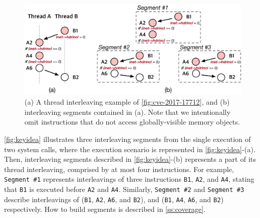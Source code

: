 %
\begin{figure}[t]
  \centering
  \includegraphics[width=0.99\linewidth]{fig/intuition.pdf}
  \caption{(a) A thread interleaving example of
    \autoref{fig:cve-2017-17712}, and (b) interleaving segments
    contained in (a).  Note that we intentionally omit instructions
    that do not access globally-visible memory objects.}
  \label{fig:keyidea}
\end{figure}
%
\autoref{fig:keyidea} illustrates three interleaving segments 
from the single execution of two system calls, 
%
where the execution scenario is represented in
\autoref{fig:keyidea}-(a).
%
Then, interleaving segments described in \autoref{fig:keyidea}-(b)
represents a part of its thread interleaving, comprised by at most
four instructions.
%
For example, \texttt{Segment \#1} represents interleavings of three
instructions \texttt{B1}, \texttt{A2}, and \texttt{A4}, stating that
\texttt{B1} is executed before \texttt{A2} and \texttt{A4}.
%
Similarly, \texttt{Segment \#2} and \texttt{Segment \#3} describe
interleavings of (\texttt{B1}, \texttt{A2}, \texttt{A6}, and
\texttt{B2}), and (\texttt{B1}, \texttt{A4}, \texttt{A6}, and
\texttt{B2}) respectively.
How to build segments is described in \autoref{ss:coverage}.

%
%
%


